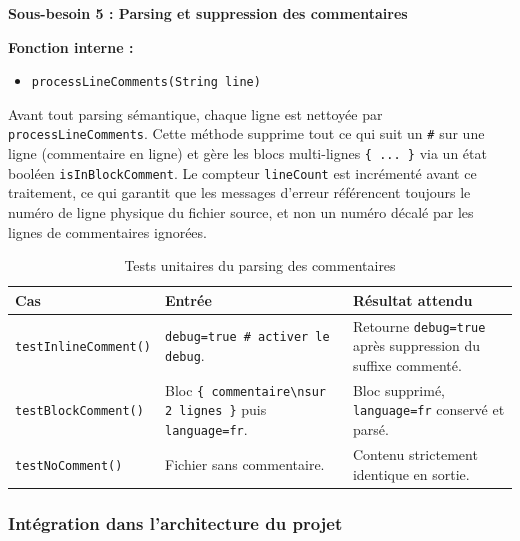 \documentclass[a4paper]{article}
\begin{document}
\begin{samepage}
\begin{besoinbox}
    \textbf{\large Sous-besoin 5 : Parsing et suppression des commentaires}

    \vspace{2mm}
    \textbf{Fonction interne :}
    \begin{itemize}
        \item \texttt{processLineComments(String line)}
    \end{itemize}
    \vspace{2mm}

    Avant tout parsing sémantique, chaque ligne est nettoyée par \texttt{processLineComments}. Cette méthode supprime tout ce qui suit un \texttt{\#} sur une ligne (commentaire en ligne) et gère les blocs multi-lignes \texttt{\{ ... \}} via un état booléen \texttt{isInBlockComment}. Le compteur \texttt{lineCount} est incrémenté avant ce traitement, ce qui garantit que les messages d'erreur référencent toujours le numéro de ligne physique du fichier source, et non un numéro décalé par les lignes de commentaires ignorées.
\end{besoinbox}

\begin{table}[H]
    \centering
    \small
    \begin{tabular}{p{4.5cm} p{4.5cm} p{5.5cm}}
        \toprule
        \textbf{Cas} & \textbf{Entrée} & \textbf{Résultat attendu} \\
        \midrule
        \texttt{testInlineComment()} & \texttt{debug=true \# activer le debug}. & Retourne \texttt{debug=true} après suppression du suffixe commenté. \\
        \midrule
        \texttt{testBlockComment()} & Bloc \texttt{\{ commentaire\textbackslash nsur 2 lignes \}} puis \texttt{language=fr}. & Bloc supprimé, \texttt{language=fr} conservé et parsé. \\
        \midrule
        \texttt{testNoComment()} & Fichier sans commentaire. & Contenu strictement identique en sortie. \\
        \bottomrule
    \end{tabular}
    \caption{Tests unitaires du parsing des commentaires}
\end{table}

\subsubsection{Intégration dans l'architecture du projet}


\end{samepage}
\end{document}
